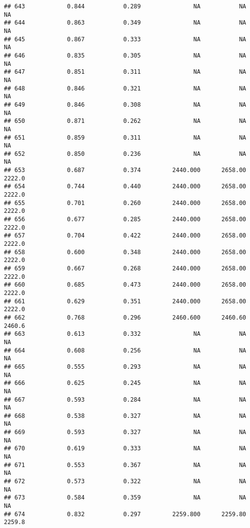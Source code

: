\documentclass[
]{article}
\begin{document}
\begin{verbatim}
## 643            0.844           0.289               NA           NA           NA
## 644            0.863           0.349               NA           NA           NA
## 645            0.867           0.333               NA           NA           NA
## 646            0.835           0.305               NA           NA           NA
## 647            0.851           0.311               NA           NA           NA
## 648            0.846           0.321               NA           NA           NA
## 649            0.846           0.308               NA           NA           NA
## 650            0.871           0.262               NA           NA           NA
## 651            0.859           0.311               NA           NA           NA
## 652            0.850           0.236               NA           NA           NA
## 653            0.687           0.374         2440.000      2658.00       2222.0
## 654            0.744           0.440         2440.000      2658.00       2222.0
## 655            0.701           0.260         2440.000      2658.00       2222.0
## 656            0.677           0.285         2440.000      2658.00       2222.0
## 657            0.704           0.422         2440.000      2658.00       2222.0
## 658            0.600           0.348         2440.000      2658.00       2222.0
## 659            0.667           0.268         2440.000      2658.00       2222.0
## 660            0.685           0.473         2440.000      2658.00       2222.0
## 661            0.629           0.351         2440.000      2658.00       2222.0
## 662            0.768           0.296         2460.600      2460.60       2460.6
## 663            0.613           0.332               NA           NA           NA
## 664            0.608           0.256               NA           NA           NA
## 665            0.555           0.293               NA           NA           NA
## 666            0.625           0.245               NA           NA           NA
## 667            0.593           0.284               NA           NA           NA
## 668            0.538           0.327               NA           NA           NA
## 669            0.593           0.327               NA           NA           NA
## 670            0.619           0.333               NA           NA           NA
## 671            0.553           0.367               NA           NA           NA
## 672            0.573           0.322               NA           NA           NA
## 673            0.584           0.359               NA           NA           NA
## 674            0.832           0.297         2259.800      2259.80       2259.8

\end{verbatim}
\end{document}
